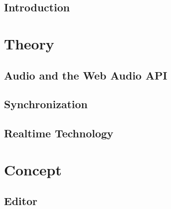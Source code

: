 \chapter{Introduction}



\part{Theory}
\label{part:theory}

\chapter{Audio and the Web Audio API}
\label{ch:audio-theory}









\chapter{Synchronization}
\label{ch:sync-theory}








\chapter{Realtime Technology}
\label{ch:realtime-theory}








\part{Concept}
\label{part-concept}

\chapter{Editor}
\label{ch:concept-editor}

